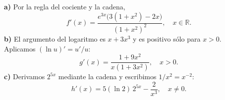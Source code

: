 \textbf{a)} Por la regla del cociente y la cadena,
\[
f'(x)=\frac{e^{3x}\bigl(3(1+x^2)-2x\bigr)}{(1+x^2)^2},
\quad x\in\mathbb R.
\]
\textbf{b)} El argumento del logaritmo es $x+3x^3$ y es positivo sólo para $x>0$. Aplicamos $(\ln u)'=u'/u$:
\[
g'(x)=\frac{1+9x^2}{x(1+3x^2)},\quad x>0.
\]
\textbf{c)} Derivamos $2^{5x}$ mediante la cadena y escribimos $1/x^2=x^{-2}$:
\[
h'(x)=5(\ln2)\,2^{5x}-\frac{2}{x^3},\quad x\ne0.
\]
